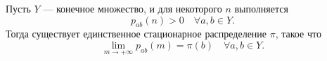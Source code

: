 \begin{corollary}
    Пусть $Y$ --- конечное множество, и для некоторого $n$ выполняется
    $$p_{ab}(n) > 0 \quad \forall a, b\in Y.$$
    Тогда существует единственное стационарное распределение $\pi$, такое что
    $$\underset{m\to+\infty}{\lim} p_{ab}(m) = \pi(b)\quad \forall a, b\in Y.$$
\end{corollary}
